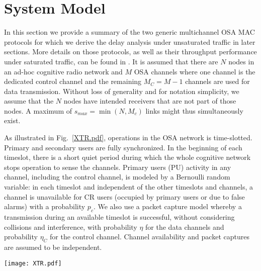 \documentclass[12pt,journal,oneside,onecolumn]{IEEEtran}
\begin{document}
\section{System Model}
\label {sec:system-model}
In this section we provide a summary of the two generic multichannel OSA MAC protocols for which we derive the delay analysis under unsaturated traffic in later sections. More details on those protocols, as well as their throughput performance under saturated traffic, can be found in \cite{pawelczak09,park11}.
It is assumed that there are $N$ nodes in an ad-hoc cognitive radio network and $M$ OSA channels where one channel is the dedicated control channel and the remaining $M_C=M-1$ channels are used for data transmission. Without loss of generality and for notation simplicity, we assume that the $N$ nodes have intended receivers that are not part of those nodes. 
A maximum of $s_{max}=\min(N,M_c)$ links might thus simultaneously exist. 

As illustrated in Fig.~\ref{XTR.pdf}, operations in the OSA network is time-slotted. Primary and secondary users are fully synchronized. 
In the beginning of each timeslot, there is a short quiet period during which the whole cognitive network stops operation to sense the channels. 
Primary users (PU) activity in any channel, including the control channel, is modeled by a Bernoulli random variable: in each timeslot 
and independent of the other timeslots and channels, a channel is unavailable for CR users (occupied by primary users or due to false alarms) 
with a probability $p_c$. We also use a packet capture model whereby a transmission during an available timeslot is successful, 
without considering collisions and interference, with  probability $\eta$ for the data channels and probability $\eta_C$ 
for the control channel. Channel availability and packet captures are assumed to be independent.
\begin{figure*}\centering 
\texttt{[image: XTR.pdf]}\caption{An example of the reservation and transmission processes. In the buffering model, a node reserves channel $Ch1$ in three timeslots ($X_R=3$). The transmission of a packet with the length 2 (timeslots) takes 4 timeslots to finish ($X_T=4$). The service time for this packet is thus $X=7$ timeslots. In the buffering model, after a channel unavailability in the second timeslot of the transmission on Ch1, the node participates in a new competition and reserve Ch2 after two timeslots. We thus have $X=8$.}\label{XTR.pdf}\end{figure*}
\end{document}
